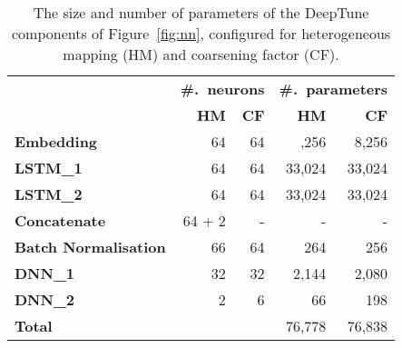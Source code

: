 \begin{table}
  \centering
  \begin{tabular}{| l r r | r r |}
    \hline
    \rowcolor{gray!50}
    & \multicolumn{2}{c}{\textbf{\#.\ neurons}} & \multicolumn{2}{c}{\textbf{\#.\ parameters}} \\
    \rowcolor{gray!50}
    & \textbf{HM} & \textbf{CF} & \textbf{HM} & \textbf{CF} \\
    \hline
    \textbf{Embedding} & 64 & 64 & ,256 & 8,256 \\
    \textbf{LSTM\_1} & 64 & 64 & 33,024 & 33,024 \\
    \textbf{LSTM\_2} & 64 & 64 & 33,024 & 33,024 \\
    \textbf{Concatenate} & 64 + 2 & - & - & - \\
    \textbf{Batch Normalisation} & 66 & 64 & 264 & 256 \\
    \textbf{DNN\_1} & 32 & 32 & 2,144 & 2,080 \\
    \textbf{DNN\_2} & 2 & 6 & 66 & 198 \\
    \hline
    \textbf{Total} & & & 76,778 & 76,838 \\
    \hline
  \end{tabular}
  \caption[DeepTune model parameters]{%
    The size and number of parameters of the DeepTune components of
    Figure~\ref{fig:nn}, configured for heterogeneous mapping (HM) and
    coarsening factor (CF).%
  }
  \label{tab:nn-size}
\end{table}
